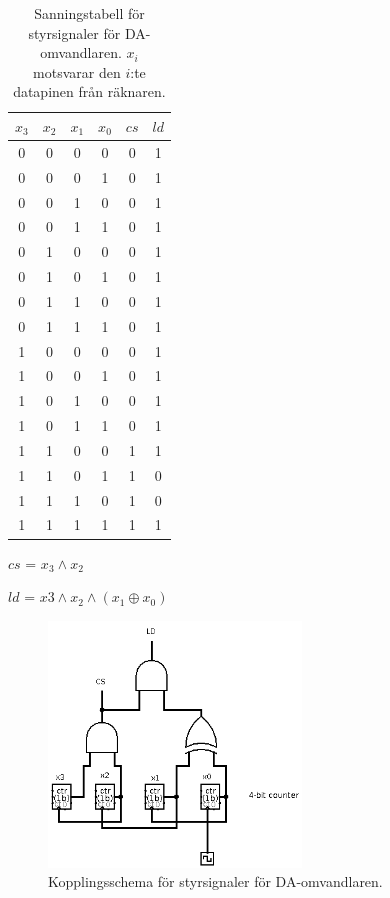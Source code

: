 \documentclass[a4paper,10pt]{article}
\begin{document}
\begin{table}[h]
\centering
\begin{tabular}{|c c c c || c c |}
\hline
$x_3$ & $x_2$ & $x_1$ & $x_0$ & $cs$ & $ld$ \\\hline
0 & 0 & 0 & 0 & 0 & 1 \\
0 & 0 & 0 & 1 & 0 & 1 \\
0 & 0 & 1 & 0 & 0 & 1 \\
0 & 0 & 1 & 1 & 0 & 1 \\
0 & 1 & 0 & 0 & 0 & 1 \\
0 & 1 & 0 & 1 & 0 & 1 \\
0 & 1 & 1 & 0 & 0 & 1 \\
0 & 1 & 1 & 1 & 0 & 1 \\
1 & 0 & 0 & 0 & 0 & 1 \\
1 & 0 & 0 & 1 & 0 & 1 \\
1 & 0 & 1 & 0 & 0 & 1 \\
1 & 0 & 1 & 1 & 0 & 1 \\
1 & 1 & 0 & 0 & 1 & 1 \\
1 & 1 & 0 & 1 & 1 & 0 \\
1 & 1 & 1 & 0 & 1 & 0 \\
1 & 1 & 1 & 1 & 1 & 1 \\
\hline
\end{tabular}

$cs$ = $x_3 \wedge x_2$

$ld$ = $x3 \wedge x_2 \wedge (x_1 \oplus x_0)$

\caption{Sanningstabell för styrsignaler för DA-omvandlaren. $x_i$ motsvarar den
$i$:te datapinen från räknaren.}
\label{tab:dac}
\end{table}

\begin{figure}[h]
\centering
\includegraphics[width=0.6\textwidth]{daccircuit.png}
\caption{Kopplingsschema för styrsignaler för DA-omvandlaren.}
\label{fig:daccircuit}
\end{figure}
\end{document}
